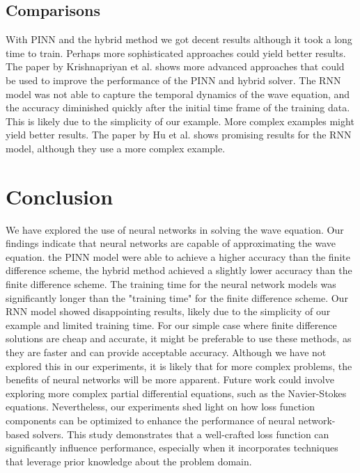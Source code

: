 \documentclass[twoside,11pt]{report}
\begin{document}
\subsection{Comparisons}
\label{sec:comparisons}

    With PINN and the hybrid method we got decent results although it took a long time to train.
    Perhaps more sophisticated approaches could yield better results. The paper by 
    Krishnapriyan et al. \cite{krishnapriyan2021characterizing} shows more advanced approaches
    that could be used to improve the performance of the PINN and hybrid solver.
    The RNN model was not able to capture the temporal dynamics of the wave equation, and the accuracy diminished
    quickly after the initial time frame of the training data. This is likely due to the simplicity of our example.
    More complex examples might yield better results. The paper by Hu et al. \cite{hu2022neuralpde} shows promising
    results for the RNN model, although they use a more complex example.

\section{Conclusion}
\label{sec:conclusion}

    We have explored the use of neural networks in solving the wave equation. Our findings indicate that
    neural networks are capable of approximating the wave equation.
    the PINN model were able to achieve a higher accuracy than the finite difference scheme, the hybrid
    method achieved a slightly lower accuracy than the finite difference scheme.
    The training time for the neural network models was significantly longer than the "training time"
    for the finite difference scheme.
    Our RNN model showed disappointing results, likely due to the simplicity of our example and limited training time.
    For our simple case where finite difference
    solutions are cheap and accurate, it might be preferable to use these methods, as they are faster and can provide
    acceptable accuracy. Although we have not explored this in our experiments, it is likely that for more complex
    problems, the benefits of neural networks will be more apparent.
    Future work could involve exploring more complex partial differential equations, such as the
    Navier-Stokes equations. 
    Nevertheless, our experiments shed light on how loss function components can be optimized 
    to enhance the performance of neural network-based solvers.
    This study demonstrates that a well-crafted loss 
    function can significantly influence performance, especially when it incorporates techniques 
    that leverage prior knowledge about the problem domain.
    
\end{document}
